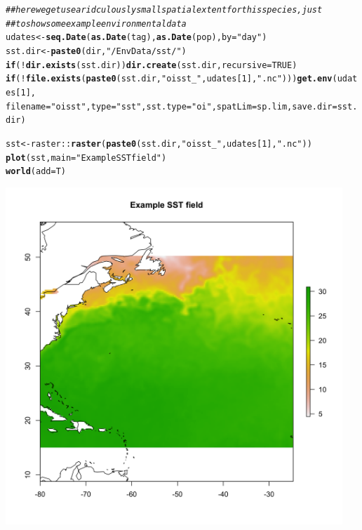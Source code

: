 \documentclass{article}\usepackage[]{graphicx}\usepackage[]{color}
\makeatletter
\newcommand{\hlnum}[1]{\textcolor[rgb]{0.686,0.059,0.569}{#1}}%
\newcommand{\hlstr}[1]{\textcolor[rgb]{0.192,0.494,0.8}{#1}}%
\newcommand{\hlcom}[1]{\textcolor[rgb]{0.678,0.584,0.686}{\textit{#1}}}%
\newcommand{\hlopt}[1]{\textcolor[rgb]{0,0,0}{#1}}%
\newcommand{\hlstd}[1]{\textcolor[rgb]{0.345,0.345,0.345}{#1}}%
\newcommand{\hlkwa}[1]{\textcolor[rgb]{0.161,0.373,0.58}{\textbf{#1}}}%
\newcommand{\hlkwb}[1]{\textcolor[rgb]{0.69,0.353,0.396}{#1}}%
\newcommand{\hlkwc}[1]{\textcolor[rgb]{0.333,0.667,0.333}{#1}}%
\newcommand{\hlkwd}[1]{\textcolor[rgb]{0.737,0.353,0.396}{\textbf{#1}}}%
\newenvironment{kframe}{%
 \def\at@end@of@kframe{}%
 \ifinner\ifhmode%
  \def\at@end@of@kframe{\end{minipage}}%
  \begin{minipage}{\columnwidth}%
 \fi\fi%
 \def\FrameCommand##1{\hskip\@totalleftmargin \hskip-\fboxsep
 \colorbox{shadecolor}{##1}\hskip-\fboxsep
     \hskip-\linewidth \hskip-\@totalleftmargin \hskip\columnwidth}%
 \MakeFramed {\advance\hsize-\width
   \@totalleftmargin\z@ \linewidth\hsize
   \@setminipage}}%
 {\par\unskip\endMakeFramed%
 \at@end@of@kframe}
\newenvironment{knitrout}{}{} %
\makeatother
\begin{document}
\begin{knitrout}\small
{}\color{fgcolor}\begin{kframe}
\begin{alltt}
\hlcom{## here we get use a ridculously small spatial extent for this species, just}
\hlcom{## to show some example environmental data}
\hlstd{udates} \hlkwb{<-} \hlkwd{seq.Date}\hlstd{(}\hlkwd{as.Date}\hlstd{(tag),} \hlkwd{as.Date}\hlstd{(pop),} \hlkwc{by} \hlstd{=} \hlstr{"day"}\hlstd{)}
\hlstd{sst.dir} \hlkwb{<-} \hlkwd{paste0}\hlstd{(dir,} \hlstr{"/EnvData/sst/"}\hlstd{)}
\hlkwa{if} \hlstd{(}\hlopt{!}\hlkwd{dir.exists}\hlstd{(sst.dir))} \hlkwd{dir.create}\hlstd{(sst.dir,} \hlkwc{recursive} \hlstd{=} \hlnum{TRUE}\hlstd{)}
\hlkwa{if} \hlstd{(}\hlopt{!}\hlkwd{file.exists}\hlstd{(}\hlkwd{paste0}\hlstd{(sst.dir,} \hlstr{"oisst_"}\hlstd{, udates[}\hlnum{1}\hlstd{],} \hlstr{".nc"}\hlstd{)))} \hlkwd{get.env}\hlstd{(udates[}\hlnum{1}\hlstd{],}
    \hlkwc{filename} \hlstd{=} \hlstr{"oisst"}\hlstd{,} \hlkwc{type} \hlstd{=} \hlstr{"sst"}\hlstd{,} \hlkwc{sst.type} \hlstd{=} \hlstr{"oi"}\hlstd{,} \hlkwc{spatLim} \hlstd{= sp.lim,} \hlkwc{save.dir} \hlstd{= sst.dir)}

\hlstd{sst} \hlkwb{<-} \hlstd{raster}\hlopt{::}\hlkwd{raster}\hlstd{(}\hlkwd{paste0}\hlstd{(sst.dir,} \hlstr{"oisst_"}\hlstd{, udates[}\hlnum{1}\hlstd{],} \hlstr{".nc"}\hlstd{))}
\hlkwd{plot}\hlstd{(sst,} \hlkwc{main} \hlstd{=} \hlstr{"Example SST field"}\hlstd{)}
\hlkwd{world}\hlstd{(}\hlkwc{add} \hlstd{= T)}
\end{alltt}
\end{kframe}
\end{knitrout}

\includegraphics[width=5in, keepaspectratio]{./example_sst.png}
\end{document}
